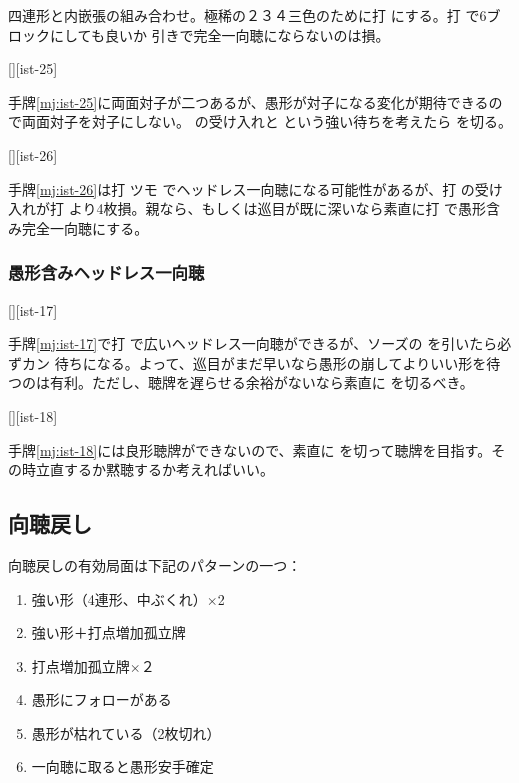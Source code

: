 \documentclass[10pt, twocolumn]{article}
\begin{document}
四連形と内嵌張の組み合わせ。極稀の２３４三色のために打  にする。打  で6ブロックにしても良いか  引きで完全一向聴にならないのは損。

[][ist-25]

手牌\ref{mj:ist-25}に両面対子が二つあるが、愚形が対子になる変化が期待できるので両面対子を対子にしない。 の受け入れと  という強い待ちを考えたら  を切る。

[][ist-26]

手牌\ref{mj:ist-26}は打  ツモ  でヘッドレス一向聴になる可能性があるが、打  の受け入れが打  より4枚損。親なら、もしくは巡目が既に深いなら素直に打  で愚形含み完全一向聴にする\citep[][p. 10]{uzaku-nankiru}。

\subsubsection*{愚形含みヘッドレス一向聴} [][ist-17]

手牌\ref{mj:ist-17}で打  で広いヘッドレス一向聴ができるが、ソーズの  を引いたら必ずカン  待ちになる。よって、巡目がまだ早いなら愚形の崩してよりいい形を待つのは有利。ただし、聴牌を遅らせる余裕がないなら素直に  を切るべき。

[][ist-18]

手牌\ref{mj:ist-18}には良形聴牌ができないので、素直に  を切って聴牌を目指す。その時立直するか黙聴するか考えればいい。


\subsection{向聴戻し}

向聴戻しの有効局面は下記のパターンの一つ：

\begin{enumerate}
\item 強い形（4連形、中ぶくれ）$\times$2
\item 強い形＋打点増加孤立牌
\item 打点増加孤立牌$\times$２
\item 愚形にフォローがある
\item 愚形が枯れている（2枚切れ）
\item 一向聴に取ると愚形安手確定
\end{enumerate}
\end{document}
